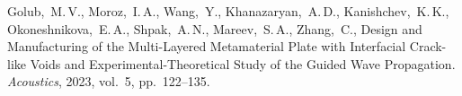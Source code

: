 \documentclass[press]{vestnik}
\begin{document}
\begin{thebibliography}{23}
Golub,~M.\,V., Moroz,~I.\,A., Wang,~Y., Khanazaryan,~A.\,D., Kanishchev,~K.\,K., Okoneshnikova,~E.\,A., Shpak,~A.\,N., Mareev,~S.\,A., Zhang,~C., Design and Manufacturing of the Multi-Layered Metamaterial Plate with Interfacial Crack-like Voids and Experimental-Theoretical Study of the Guided Wave Propagation. \emph{Acoustics}, 2023, vol.~5, pp.~122--135. 

\end{thebibliography}
\end{document}
